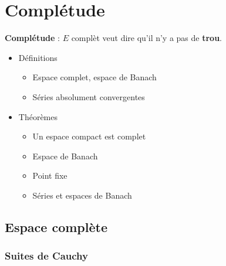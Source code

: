 \chapter{Complétude}

\begin{tcolorbox}
\textbf{Complétude} : $E$ complèt veut dire qu'il n'y a pas de  \textbf{trou}.

\begin{center}
\end{center}
\end{tcolorbox}

\begin{tcolorbox}
\begin{itemize}

    \item Définitions
      \begin{itemize}

          \item Espace complet, espace de Banach 
          \item Séries absolument convergentes

      \end{itemize}

    \item Théorèmes 
      \begin{itemize}

          \item Un espace compact est complet 
          \item Espace de Banach 
          \item Point fixe 
          \item Séries et espaces de Banach

      \end{itemize}

\end{itemize}
\end{tcolorbox}
\newpage

\section{Espace complète}

\subsection{Suites de Cauchy}


